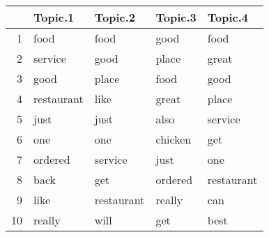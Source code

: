 \begin{tabular}{rllll}
  \hline
 & Topic.1 & Topic.2 & Topic.3 & Topic.4 \\ 
  \hline
1 & food & food & good & food \\ 
  2 & service & good & place & great \\ 
  3 & good & place & food & good \\ 
  4 & restaurant & like & great & place \\ 
  5 & just & just & also & service \\ 
  6 & one & one & chicken & get \\ 
  7 & ordered & service & just & one \\ 
  8 & back & get & ordered & restaurant \\ 
  9 & like & restaurant & really & can \\ 
  10 & really & will & get & best \\ 
   \hline
\end{tabular}
